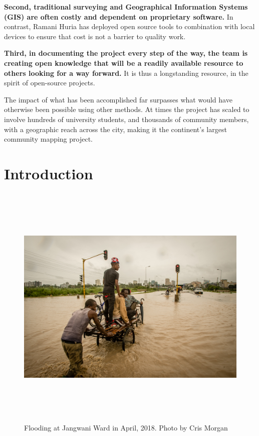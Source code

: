 \documentclass[a4paper,12pt,twoside]{article}
\begin{document}
\begin{multicols}{2}
\textbf{Second, traditional surveying and Geographical Information Systems (GIS) are often costly and dependent on proprietary software.} In contrast, Ramani Huria has deployed open source tools to combination with local devices to ensure that cost is not a barrier to quality work.  

\textbf{Third, in documenting the project every step of the way, the team is creating open knowledge that will be a readily available resource to others looking for a way forward.} It is thus a longstanding resource, in the spirit of open-source projects. 

The impact of what has been accomplished far surpasses what would have otherwise been possible using other methods. At times the project has scaled to involve hundreds of university students, and thousands of community members, with a geographic reach across the city, making it the continent's largest community mapping project.
\end{multicols}

\newpage
\section{Introduction}

\begin{figure}[h!]
	\centering
	\includegraphics[width=\textwidth, height=12cm]{images/Flooding_Jangwani_April_2018_Chris_Morgan.JPG}
	\caption{Flooding at Jangwani Ward in April, 2018. Photo by Cris Morgan}
\end{figure} 
\end{document}

